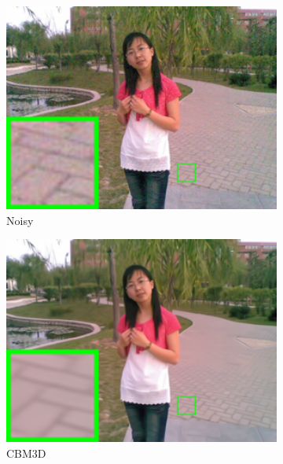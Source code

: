 \begin{figure}
    \centering
    \begin{subfigure}[t]{0.24\textwidth}
        \centering
        \includegraphics[width=1\textwidth]{images/twsc/nc/resize_br_Noisy_chinesegirl.png}
		\caption{Noisy}
    \end{subfigure}
    \hfill
    \begin{subfigure}[t]{0.24\textwidth}
        \centering
        \includegraphics[width=1\textwidth]{images/twsc/nc/resize_br_CBM3D_chinesegirl.png}
		\caption{CBM3D}
    \end{subfigure}
    \hfill
    \begin{subfigure}[t]{0.24\textwidth}
        \centering

\end{subfigure}
\end{figure}
